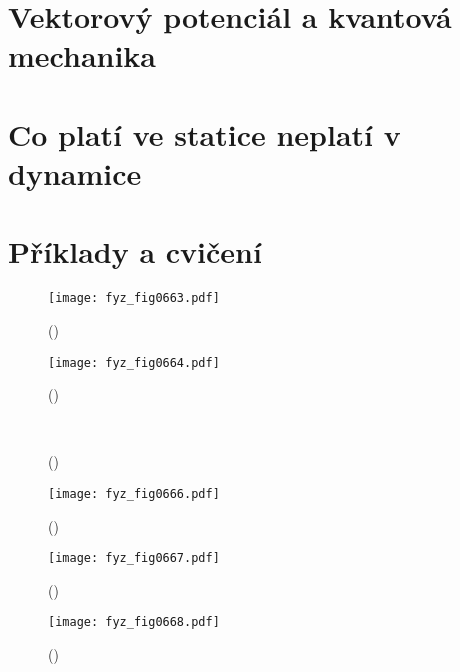   \section{Vektorový potenciál a kvantová mechanika}\label{fyz:IIchapXVsecV}
  \section{Co platí ve statice neplatí v dynamice}\label{fyz:IIchapXVsecVI}
  \section{Příklady a cvičení}\label{fyz:IIchapXVsecVII}

    \begin{figure}[ht!] %
      \centering
      \texttt{[image: fyz\_fig0663.pdf]}
      \caption{
               (\cite[s.~707]{Feynman02})}
      \label{fyz:fig0663}
    \end{figure}

    \begin{figure}[ht!] %
      \centering
      \texttt{[image: fyz\_fig0664.pdf]}
      \caption{
               (\cite[s.~707]{Feynman02})}
      \label{fyz:fig0664}
    \end{figure}

    \begin{figure}[ht!]
      \centering
                     \\
      \label{fyz:fig0665}
      \caption{
               (\cite[s.~748]{Feynman02})}
    \end{figure}

    \begin{figure}[ht!] %
      \centering
      \texttt{[image: fyz\_fig0666.pdf]}
      \caption{
               (\cite[s.~707]{Feynman02})}
      \label{fyz:fig0666}
    \end{figure}

    \begin{figure}[ht!] %
      \centering
      \texttt{[image: fyz\_fig0667.pdf]}
      \caption{
               (\cite[s.~707]{Feynman02})}
      \label{fyz:fig0667}
    \end{figure}


    \begin{figure}[ht!] %
      \centering
      \texttt{[image: fyz\_fig0668.pdf]}
      \caption{
               (\cite[s.~707]{Feynman02})}
      \label{fyz:fig0668}
    \end{figure}

